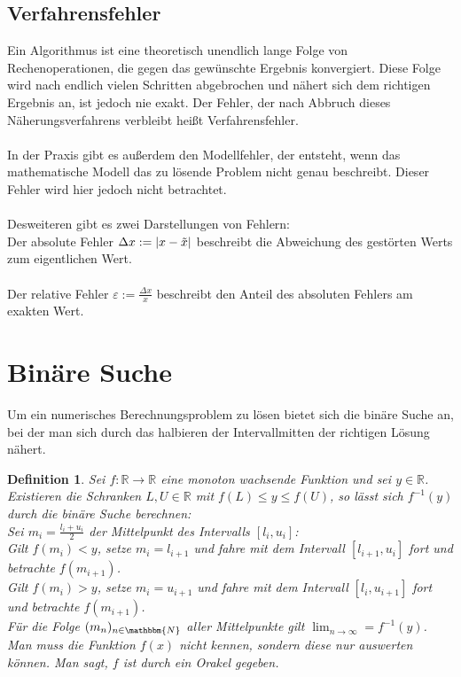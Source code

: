 \documentclass[12pt]{article}
\newcommand{\N}{\mathbbm{N}} %
\newcommand{\R}{\mathbb{R}} %
\newtheorem{definition}[satz]{Definition}
\begin{document}
\subsection*{Verfahrensfehler}
Ein Algorithmus ist eine theoretisch unendlich lange Folge von Rechenoperationen, die gegen das gewünschte Ergebnis konvergiert. Diese Folge wird nach endlich vielen Schritten abgebrochen und nähert sich dem richtigen Ergebnis an, ist jedoch nie exakt. Der Fehler, der nach Abbruch dieses Näherungsverfahrens verbleibt heißt Verfahrensfehler. \\ 
\\
In der Praxis gibt es außerdem den Modellfehler, der entsteht, wenn das mathematische Modell das zu lösende Problem nicht genau beschreibt. Dieser Fehler wird hier jedoch nicht betrachtet. \\ 
\\
Desweiteren gibt es zwei Darstellungen von Fehlern: \\
Der absolute Fehler $\Delta x:=|x- \Tilde{x}|$ beschreibt die Abweichung des gestörten Werts zum eigentlichen Wert. \\
\\
Der relative Fehler $\varepsilon:= \frac{\Delta x}{x}$ beschreibt den Anteil des absoluten Fehlers am exakten Wert. 

\newpage
\section{Binäre Suche}
Um ein numerisches Berechnungsproblem zu lösen bietet sich die binäre Suche an, bei der man sich durch das halbieren der Intervallmitten der richtigen Lösung nähert.
\begin{definition} 
   Sei $f: \R \to \R$ eine monoton wachsende Funktion und sei $y \in \R$. Existieren die Schranken $L,U \in \R$ mit $f(L) \leq y \leq f(U)$, so lässt sich $f^{-1}(y)$ durch die binäre Suche berechnen: \\
   Sei $m_i= \frac{l_i+u_i}{2}$ der Mittelpunkt des Intervalls $[l_i,u_i]$: \\
   Gilt $f(m_i)< y$, setze $m_i=l_{i+1}$ und fahre mit dem Intervall $[l_{i+1},u_i]$ fort und betrachte $f(m_{i+1})$. \\
   Gilt $f(m_i)>y$, setze $m_i=u_{i+1}$ und fahre mit dem Intervall $[l_i,u_{i+1}]$ fort und betrachte $f(m_{i+1})$. \\ 
   Für die Folge $(m_n)_{n \in \N}$ aller Mittelpunkte gilt $\lim_{n \to \infty} =f^{-1}(y)$.
   Man muss die Funktion $f(x)$ nicht kennen, sondern diese nur auswerten können. Man sagt, $f$ ist durch ein Orakel gegeben.
\end{definition}
\end{document}

